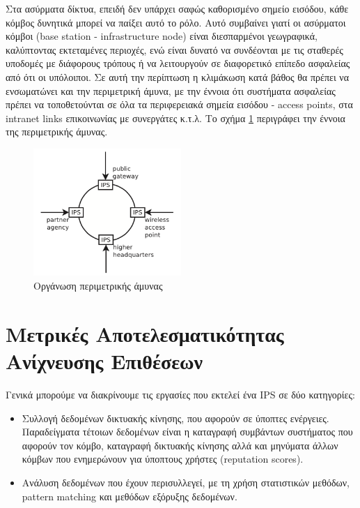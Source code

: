 \documentclass[12pt]{report}
\begin{document}
Στα ασύρματα δίκτυα, επειδή δεν υπάρχει σαφώς καθορισμένο σημείο εισόδου, κάθε κόμβος δυνητικά μπορεί να παίξει αυτό το ρόλο. Αυτό συμβαίνει γιατί οι ασύρματοι κόμβοι (\textlatin{base station - infrastructure node}) είναι διεσπαρμένοι γεωγραφικά, καλύπτοντας εκτεταμένες περιοχές, ενώ είναι δυνατό να συνδέονται με τις σταθερές υποδομές με διάφορους τρόπους ή να λειτουργούν σε διαφορετικό επίπεδο ασφαλείας από ότι οι υπόλοιποι. Σε αυτή την περίπτωση η κλιμάκωση κατά βάθος θα πρέπει να ενσωματώνει και την περιμετρική άμυνα, με την έννοια ότι συστήματα ασφαλείας πρέπει να τοποθετούνται σε όλα τα περιφερειακά σημεία εισόδου - \textlatin{access points}, στα \textlatin{intranet links} επικοινωνίας με συνεργάτες κ.τ.λ. Το σχήμα \ref{fig:all-arr-def} περιγράφει την έννοια της περιμετρικής άμυνας.
\begin{figure}[ht]
\centering
\includegraphics[width=0.5\textwidth]{all-arr-def}
\caption{Οργάνωση περιμετρικής άμυνας}
\label{fig:all-arr-def}
\end{figure}

\section{Μετρικές Αποτελεσματικότητας Ανίχνευσης Επιθέσεων}
Γενικά μπορούμε να διακρίνουμε τις εργασίες που εκτελεί ένα \textlatin{IPS} σε δύο κατηγορίες:
\begin{itemize}
  \item Συλλογή δεδομένων δικτυακής κίνησης, που αφορούν σε ύποπτες ενέργειες. Παραδείγματα τέτοιων δεδομένων είναι η καταγραφή συμβάντων συστήματος που αφορούν τον κόμβο, καταγραφή δικτυακής κίνησης αλλά και μηνύματα άλλων κόμβων που ενημερώνουν για ύποπτους χρήστες (\textlatin{reputation scores}).
  \item Ανάλυση δεδομένων που έχουν περισυλλεγεί, με τη χρήση στατιστικών μεθόδων, \textlatin{pattern matching} και μεθόδων εξόρυξης δεδομένων.
\end{itemize}
\end{document}
